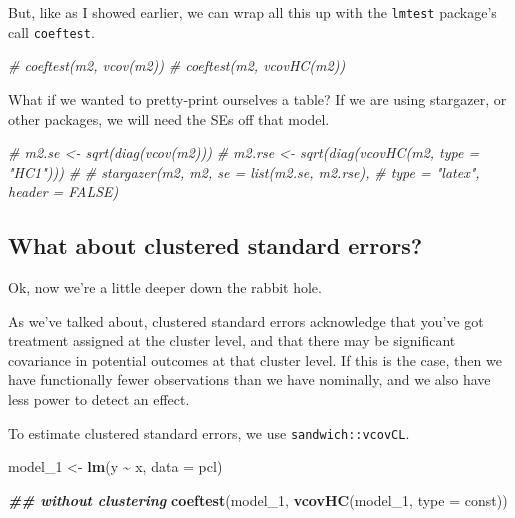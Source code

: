 \documentclass[
]{article}
\newenvironment{Shaded}{\begin{snugshade}}{\end{snugshade}}
\newcommand{\AttributeTok}[1]{\textcolor[rgb]{0.13,0.29,0.53}{#1}}
\newcommand{\CommentTok}[1]{\textcolor[rgb]{0.56,0.35,0.01}{\textit{#1}}}
\newcommand{\DocumentationTok}[1]{\textcolor[rgb]{0.56,0.35,0.01}{\textbf{\textit{#1}}}}
\newcommand{\FunctionTok}[1]{\textcolor[rgb]{0.13,0.29,0.53}{\textbf{#1}}}
\newcommand{\NormalTok}[1]{#1}
\newcommand{\OtherTok}[1]{\textcolor[rgb]{0.56,0.35,0.01}{#1}}
\newcommand{\SpecialCharTok}[1]{\textcolor[rgb]{0.81,0.36,0.00}{\textbf{#1}}}
\newcommand{\StringTok}[1]{\textcolor[rgb]{0.31,0.60,0.02}{#1}}
\theoremstyle{definition}
\theoremstyle{definition}
\theoremstyle{definition}
\theoremstyle{definition}
\theoremstyle{remark}
\begin{document}
But, like as I showed earlier, we can wrap all this up with the \texttt{lmtest} package's call \texttt{coeftest}.

\begin{Shaded}
\begin{Highlighting}[]
\CommentTok{\# coeftest(m2, vcov(m2))}
\CommentTok{\# coeftest(m2, vcovHC(m2))}
\end{Highlighting}
\end{Shaded}

What if we wanted to pretty-print ourselves a table? If we are using stargazer, or other packages, we will need the SEs off that model.

\begin{Shaded}
\begin{Highlighting}[]
\CommentTok{\# m2.se  \textless{}{-} sqrt(diag(vcov(m2)))}
\CommentTok{\# m2.rse \textless{}{-} sqrt(diag(vcovHC(m2, type = "HC1")))}
\CommentTok{\# }
\CommentTok{\# stargazer(m2, m2, se = list(m2.se, m2.rse), }
\CommentTok{\#           type = "latex", header = FALSE)}
\end{Highlighting}
\end{Shaded}

\subsection{What about clustered standard errors?}\label{what-about-clustered-standard-errors}

Ok, now we're a little deeper down the rabbit hole.

As we've talked about, clustered standard errors acknowledge that you've got treatment assigned at the cluster level, and that there may be significant covariance in potential outcomes at that cluster level. If this is the case, then we have functionally fewer observations than we have nominally, and we also have less power to detect an effect.

To estimate clustered standard errors, we use \texttt{sandwich::vcovCL}.

\begin{Shaded}
\begin{Highlighting}[]
\NormalTok{model\_1 }\OtherTok{\textless{}{-}} \FunctionTok{lm}\NormalTok{(y }\SpecialCharTok{\textasciitilde{}}\NormalTok{ x, }\AttributeTok{data =}\NormalTok{ pcl)}

\DocumentationTok{\#\# without clustering }
\FunctionTok{coeftest}\NormalTok{(model\_1, }\FunctionTok{vcovHC}\NormalTok{(model\_1, }\AttributeTok{type =} \StringTok{\textquotesingle{}const\textquotesingle{}}\NormalTok{))}
\end{Highlighting}
\end{Shaded}
\end{document}
